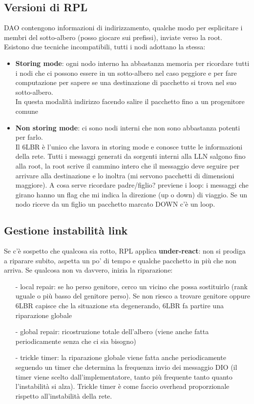 \documentclass[12pt,italian]{report}
\begin{document}
\subsection{Versioni di RPL}
DAO contengono informazioni di indirizzamento, qualche modo per esplicitare i membri del sotto-albero (posso giocare sui prefissi), inviate verso la root. \\ Esistono due tecniche incompatibili, tutti i nodi adottano la stessa:
\begin{itemize}
    \item \textbf{Storing mode}: ogni nodo interno ha abbastanza memoria per ricordare tutti i nodi che ci possono essere in un sotto-albero nel caso peggiore e per fare computazione per sapere se una destinazione di pacchetto si trova nel suo sotto-albero. \\ In questa modalità indirizzo facendo salire il pacchetto fino a un progenitore comune
    \item \textbf{Non storing mode}: ci sono nodi interni che non sono abbastanza potenti per farlo. \\ Il 6LBR è l'unico che lavora in storing mode e conosce tutte le informazioni della rete. Tutti i messaggi generati da sorgenti interni alla LLN salgono fino alla root, la root scrive il cammino intero che il messaggio deve seguire per arrivare alla destinazione e lo inoltra (mi servono pacchetti di dimensioni maggiore). 
    \bigbreak
    A cosa serve ricordare padre/figlio? previene i loop: i messaggi che girano hanno un flag che mi indica la direzione (up o down) di viaggio. Se un nodo riceve da un figlio un pacchetto marcato DOWN c'è un loop.
\end{itemize}

\subsection{Gestione instabilità link}
Se c'è sospetto che qualcosa sia rotto, RPL applica \textbf{under-react}: non si prodiga a riparare subito, aspetta un po' di tempo e qualche pacchetto in più che non arriva. 
\bigbreak
Se qualcosa non va davvero, inizia la riparazione:
\begin{itemize}
    \item [-] local repair: se ho perso genitore, cerco un vicino che possa sostituirlo (rank uguale o più basso del genitore perso).
    \bigbreak
    Se non riesco a trovare genitore oppure 6LBR capisce che la situazione sta degenerando, 6LBR fa partire una riparazione globale
    \item [-] global repair: ricostruzione totale dell'albero (viene anche fatta periodicamente senza che ci sia bisogno)
    \item [-] trickle timer: la riparazione globale viene fatta anche periodicamente seguendo un timer che determina la frequenza invio dei messaggio DIO (il timer viene scelto dall'implementatore, tanto più frequente tanto quanto l'instabilità si alza). Trickle timer è come faccio overhead proporzionale rispetto all'instabilità della rete. 
\end{itemize}
\end{document}
